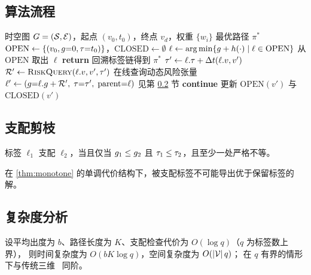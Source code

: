 \subsection{算法流程}

\begin{algorithm}[t]
\caption{\methodnamelatex：时间依赖风险感知最短路搜索}
\label{alg:td-risk-astar}
\begin{algorithmic}[1]
  \Input 时空图 $G = (\mathcal{S}, \mathcal{E})$，起点 $(v_0, t_0)$，终点 $v_d$，权重 $\{w_i\}$
  \Output 最优路径 $\pi^{*}$
  \State $\mathrm{OPEN} \gets \{(v_0, g{=}0, \tau{=}t_0)\}$，$\mathrm{CLOSED} \gets \emptyset$
    \State $\ell \gets \operatorname*{arg\,min}\{g + h(\cdot) \mid \ell \in \mathrm{OPEN}\}$
    \State 从 $\mathrm{OPEN}$ 取出 $\ell$
      \State \textbf{return} 回溯标签链得到 $\pi^{*}$
    \EndIf
      \State $\tau' \gets \ell.\tau + \Delta t(\ell.v, v')$
      \State $\mathcal{R}' \gets \textsc{RiskQuery}(\ell.v, v', \tau')$       \Comment 在线查询动态风险张量
      \State $\ell' \gets (g{=}\ell.g + \mathcal{R}',\; \tau{=}\tau',\; \mathrm{parent}{=}\ell)$
       \Comment 见第 \ref{sec:dominance} 节
        \State \textbf{continue}
      \EndIf
      \State 更新 $\mathrm{OPEN}(v')$ 与 $\mathrm{CLOSED}(v')$
    \EndFor
  \EndWhile
\end{algorithmic}
\end{algorithm}

\subsection{支配剪枝}
\label{sec:dominance}

\begin{definition}[标签支配]
标签 $\ell_1$ 支配 $\ell_2$，当且仅当
$g_1 \le g_2$ 且 $\tau_1 \le \tau_2$，且至少一处严格不等。
\end{definition}

\begin{theorem}
在 \cref{thm:monotone} 的单调代价结构下，被支配标签不可能导出优于保留标签的解。
\end{theorem}


\subsection{复杂度分析}

设平均出度为 $b$、路径长度为 $K$、支配检查代价为 $O(\log q)$（$q$ 为标签数上界），
则时间复杂度为 $O(bK \log q)$，空间复杂度为 $O(|\mathcal{V}| \, q)$；
在 $q$ 有界的情形下与传统三维 \basestatic \ 同阶。
